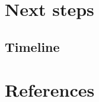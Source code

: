 \documentclass[
  ,doc,11pt, twoside,floatsintext]{apa6}
\begin{document}
\newpage

\hypertarget{next-steps}{%
\section{Next steps}\label{next-steps}}

\hypertarget{timeline}{%
\subsection{Timeline}\label{timeline}}

\newpage

\hypertarget{references}{%
\section{References}\label{references}}

\setlength{\parindent}{-0.5in}
\setlength{\leftskip}{0.5in}
\end{document}
